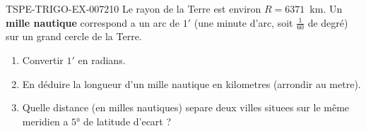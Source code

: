 \begin{exercice}{TSPE-TRIGO-EX-007}{2}{10}
Le rayon de la Terre est environ $R = 6371$~km. Un \textbf{mille nautique} correspond a un arc de $1'$ (une minute d'arc, soit $\frac{1}{60}$ de degré) sur un grand cercle de la Terre.
\begin{enumerate}
  \item Convertir $1'$ en radians.
  \item En déduire la longueur d'un mille nautique en kilometres (arrondir au metre).
  \item Quelle distance (en milles nautiques) separe deux villes situees sur le même meridien a $5°$ de latitude d'ecart ?
\end{enumerate}
\end{exercice}
